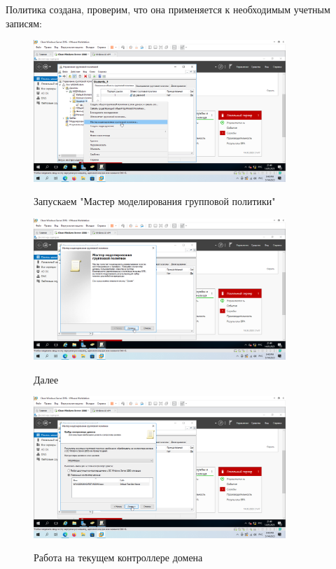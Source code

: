 \documentclass[a4paper]{article}
\begin{document}
  Политика создана, проверим, что она применяется к необходимым учетным записям:

  \begin{figure}[H]
    \centering
    \includegraphics[width=0.85\textwidth]{5_0119}
    \label{img:119}
    \caption{Запускаем "Мастер моделирования групповой политики"}
  \end{figure}

  \begin{figure}[H]
    \centering
    \includegraphics[width=0.85\textwidth]{5_0120}
    \label{img:120}
    \caption{Далее}
  \end{figure}

  \begin{figure}[H]
    \centering
    \includegraphics[width=0.85\textwidth]{5_0121}
    \label{img:121}
    \caption{Работа на текущем контроллере домена}
  \end{figure}
\end{document}
